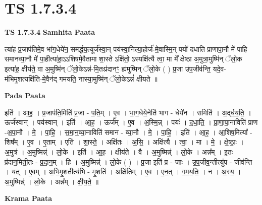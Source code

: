 \documentclass[17pt]{extarticle}
\begin{document}
\section*{ TS 1.7.3.4 }

\textbf{TS 1.7.3.4 } \newline
\textbf{Samhita Paata} \newline

त्या॑ह प्र॒जाप॑तिमे॒व भा॑ग॒धेये॑न॒ सम॑र्द्धय॒त्यूर्ज॑स्वा॒न् पय॑स्वा॒नित्या॒होर्ज॑-मे॒वास्मि॒न् पयो॑ दधाति प्राणापा॒नौ मे॑ पाहि समानव्या॒नौ मे॑ पा॒हीत्या॑हा॒ऽऽशिष॑मे॒वैतामा शा॒स्ते ऽक्षि॑तो॒ ऽस्यक्षि॑त्यै त्वा॒ मा मे᳚ क्षेष्ठा अ॒मुत्रा॒मुष्मि॑न् ॅलो॒क इत्या॑ह॒ क्षीय॑ते॒ वा अ॒मुष्मि॑न् ॅलो॒केऽन्न॑-मि॒तःप्र॑दानꣳ॒॒ ह्य॑मुष्मिन् ॅलो॒के ( ) प्र॒जा उ॑प॒जीव॑न्ति॒ यदे॒व-म॑भिमृ॒शत्यक्षि॑ति-मे॒वैन॑द् गमयति॒ नास्या॒मुष्मि॑न् ॅलो॒केऽन्नं॑ क्षीयते ॥ \newline

\textbf{Pada Paata} \newline

इति॑ । आ॒ह॒ । प्र॒जाप॑ति॒मिति॑ प्र॒जा - प॒ति॒म् । ए॒व । भा॒ग॒धेये॒नेति॑ भाग - धेये॑न । समिति॑ । अ॒द्‌र्ध॒य॒ति॒ । ऊर्ज॑स्वान् । पय॑स्वान् । इति॑ । आ॒ह॒ । ऊर्ज᳚म् । ए॒व । अ॒स्मि॒न्न् । पयः॑ । द॒धा॒ति॒ । प्रा॒णा॒पा॒नाविति॑ प्राण -अ॒पा॒नौ । मे॒ । पा॒हि॒ । स॒मा॒न॒व्या॒नाविति॑ समान - व्या॒नौ । मे॒ । पा॒हि॒ । इति॑ । आ॒ह॒ । आ॒शिष॒मित्या᳚ - शिष᳚म् । ए॒व । ए॒ताम् । एति॑ । शा॒स्ते॒ । अक्षि॑तः । अ॒सि॒ । अक्षि॑त्यै । त्वा॒ । मा । मे॒ । क्षे॒ष्ठाः॒ । अ॒मुत्र॑ । अ॒मुष्मिन्न्॑ । लो॒के । इति॑ । आ॒ह॒ । क्षीय॑ते । वै । अ॒मुष्मिन्न्॑ । लो॒के । अन्न᳚म् । इ॒तः प्र॑दान॒मिती॒तः - प्र॒दा॒न॒म् । हि । अ॒मुष्मिन्न्॑ । लो॒के ( ) । प्र॒जा इति॑ प्र - जाः । उ॒प॒जीव॒न्तीत्यु॑प - जीव॑न्ति । यत् । ए॒वम् । अ॒भि॒मृ॒शतीत्य॑भि - मृ॒शति॑ । अक्षि॑तिम् । ए॒व । ए॒न॒त् । ग॒म॒य॒ति॒ । न । अ॒स्य॒ । अ॒मुष्मिन्न्॑ । लो॒के । अन्न᳚म् । क्षी॒य॒ते॒ ॥  \newline


\textbf{Krama Paata} \newline
\end{document}
